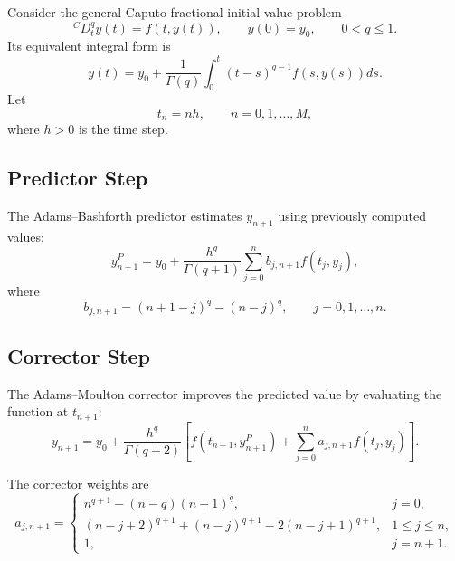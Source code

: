 \documentclass[12pt,a4paper,oneside]{report}
\newcommand{\CaputoD}[2]{{}^{C}D_{#1}^{#2}}
\begin{document}
Consider the general Caputo fractional initial value problem
\begin{equation}
\CaputoD{t}{q}y(t)=f(t,y(t)),
\qquad
y(0)=y_0,
\qquad
0<q\leq1.
\label{eq:general_fivp}
\end{equation}
Its equivalent integral form is
\begin{equation}
y(t)=y_0+\frac{1}{\Gamma(q)}
\int_0^t(t-s)^{q-1}f(s,y(s))ds.
\label{eq:general_integral}
\end{equation}
Let
\[
t_n=nh,\qquad n=0,1,\ldots,M,
\]
where $h>0$ is the time step.

\subsection{Predictor Step}

The Adams--Bashforth predictor estimates $y_{n+1}$ using previously computed values:
\begin{equation}
y_{n+1}^{P}
=
y_0+\frac{h^q}{\Gamma(q+1)}
\sum_{j=0}^{n} b_{j,n+1} f(t_j,y_j),
\label{eq:correct_predictor}
\end{equation}
where
\begin{equation}
b_{j,n+1}=(n+1-j)^q-(n-j)^q,
\qquad
j=0,1,\ldots,n.
\label{eq:correct_predictor_weights}
\end{equation}

\subsection{Corrector Step}

The Adams--Moulton corrector improves the predicted value by evaluating the function at $t_{n+1}$:
\begin{equation}
y_{n+1}
=
y_0+
\frac{h^q}{\Gamma(q+2)}
\left[
f(t_{n+1},y_{n+1}^{P})
+
\sum_{j=0}^{n}a_{j,n+1}f(t_j,y_j)
\right].
\label{eq:correct_corrector}
\end{equation}

The corrector weights are
\begin{equation}
a_{j,n+1}=
\begin{cases}
n^{q+1}-(n-q)(n+1)^q, & j=0,\\[4pt]
(n-j+2)^{q+1}+(n-j)^{q+1}-2(n-j+1)^{q+1}, & 1\leq j\leq n,\\[4pt]
1, & j=n+1.
\end{cases}
\label{eq:correct_corrector_weights}
\end{equation}
\end{document}
